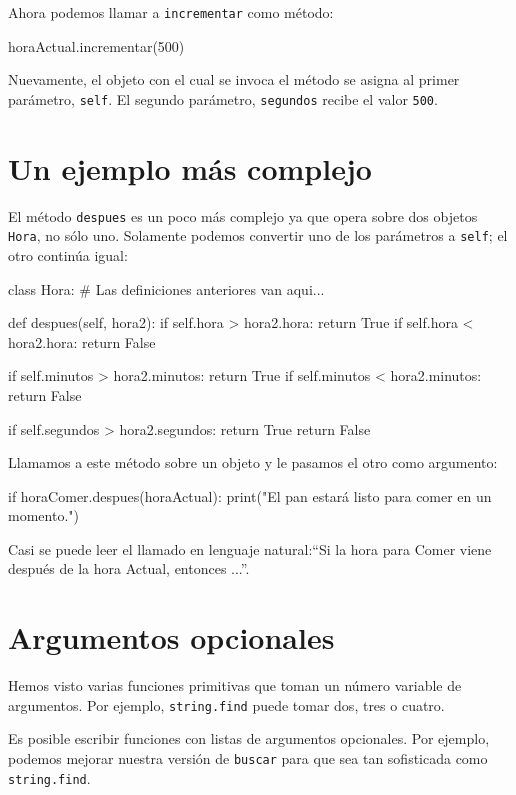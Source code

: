 Ahora podemos llamar a \texttt{incrementar} como método:
\begin{pythoncode}
horaActual.incrementar(500)
\end{pythoncode}

Nuevamente, el objeto con el cual se invoca el método se asigna al
primer parámetro, \texttt{self}. El segundo parámetro, \texttt{segundos}
recibe el valor \texttt{500}.

\section{Un ejemplo más complejo}

El método \texttt{despues} es un poco más complejo ya que opera sobre
dos objetos \texttt{Hora}, no sólo uno. Solamente podemos convertir
uno de los parámetros a \texttt{self}; el otro continúa igual:

\begin{pythoncode}
class Hora:
  # Las definiciones anteriores van aqui...

  def despues(self, hora2):
    if self.hora > hora2.hora:
      return True
    if self.hora < hora2.hora:
      return False

    if self.minutos > hora2.minutos:
      return True
    if self.minutos < hora2.minutos:
      return False

    if self.segundos > hora2.segundos:
      return True
    return False
\end{pythoncode}
 Llamamos a este método sobre un objeto y le pasamos el otro como
argumento:
\begin{pythoncode}
if horaComer.despues(horaActual):
  print("El pan estará listo para comer en un momento.")
\end{pythoncode}

Casi se puede leer el llamado en lenguaje natural:``Si la hora para
Comer viene después de la hora Actual, entonces ...''.

\section{Argumentos opcionales}

Hemos visto varias funciones primitivas que toman un número variable
de argumentos. Por ejemplo, \texttt{string.find} puede tomar dos,
tres o cuatro.

Es posible escribir funciones con listas de argumentos opcionales.
Por ejemplo, podemos mejorar nuestra versión de \texttt{buscar} para
que sea tan sofisticada como \texttt{string.find}.

